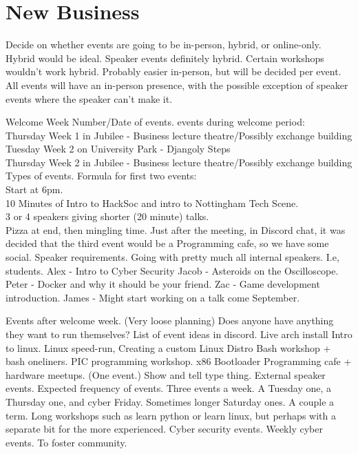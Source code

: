 \documentclass[11pt,hacksoc]{meetingmins}
\begin{document}
\section{New Business}
\begin{items}
  \item {Decide on whether events are going to be in-person, hybrid, or online-only.}
  \subsubitem Hybrid would be ideal.
  \subsubitem Speaker events definitely hybrid.
  \subsubitem Certain workshops wouldn't work hybrid. Probably easier in-person, but will be decided per event.
  \subsubitem All events will have an in-person presence, with the possible exception of speaker events where the speaker can't make it.

  \item {Welcome Week}
  \subitem Number/Date of events.
   events during welcome period:\\
Thursday Week 1 in Jubilee - Business lecture theatre/Possibly exchange building\\
Tuesday Week 2 on University Park - Djangoly Steps\\
Thursday Week 2 in Jubilee - Business lecture theatre/Possibly exchange building\\
  \subitem Types of events.
  \subsubitem Formula for first two events: \\
  Start at 6pm. \\
  10 Minutes of Intro to HackSoc and intro to Nottingham Tech Scene. \\
  3 or 4 speakers giving shorter (20 minute) talks. \\
  Pizza at end, then mingling time.
  \subsubitem Just after the meeting, in Discord chat, it was decided that the third event would be a Programming cafe, so we have some social.
  \subitem Speaker requirements.
  \subsubitem Going with pretty much all internal speakers. I.e, students.
  \subsubitem Alex - Intro to Cyber Security
  \subsubitem Jacob - Asteroids on the Oscilloscope.
  \subsubitem Peter - Docker and why it should be your friend.
  \subsubitem Zac - Game development introduction.
  \subsubitem James - Might start working on a talk come September.

  \item {Events after welcome week. (Very loose planning)}
  \subitem Does anyone have anything they want to run themselves?
  \subsubitem List of event ideas in discord.
  \subsubitem Live arch install
  \subsubitem Intro to linux.
  \subsubitem Linux speed-run,
  \subsubitem Creating a custom Linux Distro
  \subsubitem Bash workshop + bash oneliners.
  \subsubitem PIC programming workshop.
  \subsubitem x86 Bootloader
  \subsubitem Programming cafe + hardware meetups. (One event.) Show and tell type thing.
  \subsubitem External speaker events.
  \subitem Expected frequency of events.
  \subsubitem Three events a week. A Tuesday one, a Thursday one, and cyber Friday.
  \subsubitem Sometimes longer Saturday ones. A couple a term. Long workshops such as learn python or learn linux, but perhaps with a separate bit for the more experienced.
  \subitem Cyber security events.
  \subsubitem Weekly cyber events. To foster community.


\end{items}
\end{document}
